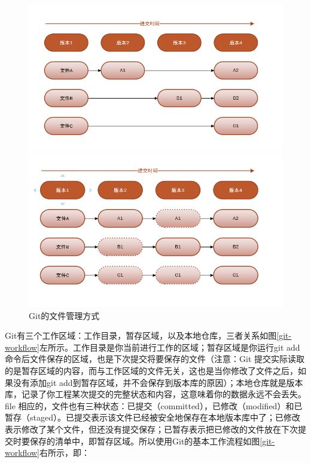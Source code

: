 \begin{figure}[ht]
    \centering
    \begin{minipage}[c]{0.45\textwidth}
        \includegraphics[width=\textwidth]{image/git/git-file.png}
    \end{minipage}
    \begin{minipage}[c]{0.45\textwidth}
        \includegraphics[width=\textwidth]{image/git/git-file2.png}
    \end{minipage}
    \caption{Git的文件管理方式}
    \label{git-file}
\end{figure}

Git有三个工作区域：工作目录，暂存区域，以及本地仓库，三者关系如图\ref{git-workflow}左所示。工作目录是你当前进行工作的区域；暂存区域是你运行git add命令后文件保存的区域，也是下次提交将要保存的文件（注意：Git 提交实际读取的是暂存区域的内容，而与工作区域的文件无关，这也是当你修改了文件之后，如果没有添加git add到暂存区域，并不会保存到版本库的原因）；本地仓库就是版本库，记录了你工程某次提交的完整状态和内容，这意味着你的数据永远不会丢失。 file 相应的，文件也有三种状态：已提交（committed），已修改（modified）和已暂存（staged）。已提交表示该文件已经被安全地保存在本地版本库中了；已修改表示修改了某个文件，但还没有提交保存；已暂存表示把已修改的文件放在下次提交时要保存的清单中，即暂存区域。所以使用Git的基本工作流程如图\ref{git-workflow}右所示，即：

